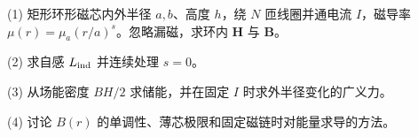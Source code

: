 (1) 矩形环形磁芯内外半径 \(a,b\)、高度 \(h\)，绕 \(N\) 匝线圈并通电流 \(I\)，磁导率 \(\mu(r)=\mu_a(r/a)^s\)。忽略漏磁，求环内 \(\mathbf H\) 与 \(\mathbf B\)。

(2) 求自感 \(L_{\rm ind}\) 并连续处理 \(s=0\)。

(3) 从场能密度 \(BH/2\) 求储能，并在固定 \(I\) 时求外半径变化的广义力。

(4) 讨论 \(B(r)\) 的单调性、薄芯极限和固定磁链时对能量求导的方法。
